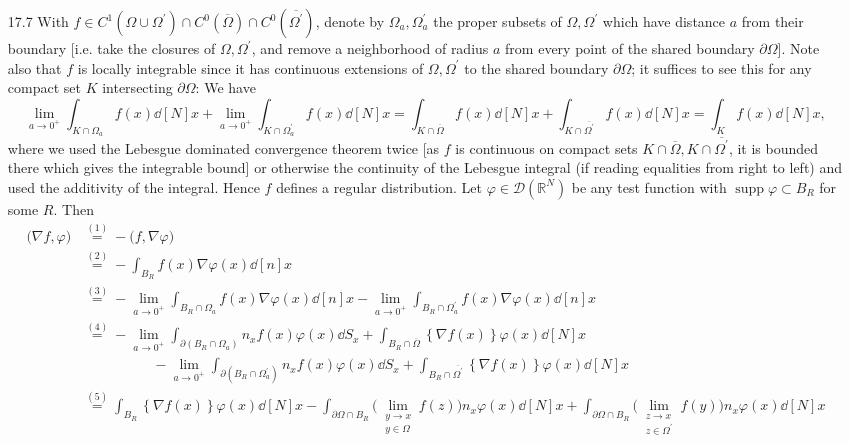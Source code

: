 \documentclass[11pt]{article}
\newcommand{\cbr}[1]{\left\{#1\right\}}
\newcommand{\eq}[1]{\overset{(#1)}{=}}
\DeclareMathOperator{\supp}{supp}
\begin{document}
\begin{enumerate}
    \hrulefill

    \item[17.7] With $f\in C^1(\Omega\cup \Omega^\prime)\cap C^0(\overline \Omega)\cap C^0(\overline{\Omega^\prime})$, denote by $\Omega_a,\Omega^\prime_a$ the proper subsets of $\Omega,\Omega^\prime$ which have distance $a$ from their boundary [i.e. take the closures of $\Omega,\Omega^\prime$, and remove a neighborhood of radius $a$ from every point of the shared boundary $\partial \Omega$]. Note also that $f$ is locally integrable since it has continuous extensions of $\Omega,\Omega^\prime$ to the shared boundary $\partial \Omega$; it suffices to see this for any compact set $K$ intersecting $\partial \Omega$: We have %
    \[\lim_{a\to 0^+}\int_{K\cap \Omega_a}f(x)\dd[N]x+\lim_{a\to 0^+}\int_{K\cap\Omega^\prime_a} f(x)\dd[N]x = \int_{K\cap\overline{\Omega}}f(x)\dd[N]x + \int_{K\cap\overline{\Omega^\prime}}f(x)\dd[N]x = \int_{K}f(x)\dd[N]x,\] where we used the Lebesgue dominated convergence theorem twice [as $f$ is continuous on compact sets $K\cap\overline{\Omega},K\cap\overline{\Omega^\prime}$, it is bounded there which gives the integrable bound] or otherwise the continuity of the Lebesgue integral (if reading equalities from right to left) and used the additivity of the integral. Hence $f$ defines a regular distribution. Let $\varphi\in\mathcal{D}(\mathbb{R}^N)$ be any test function with $\supp\varphi\subset B_R$ for some $R$. Then 
    \begin{align*}
        \Big(\nabla f,\varphi\Big)&\eq{1} -\Big(f,\nabla \varphi\Big)\\
        &\eq{2} -\int_{B_R}f(x)\nabla\varphi(x)\dd[n]x\\
        &\eq{3} -\lim_{a\to 0^+}\int_{B_R\cap\Omega_a}f(x)\nabla\varphi(x)\dd[n]x -\lim_{a\to 0^+}\int_{B_R\cap\Omega^\prime_a}f(x)\nabla\varphi(x)\dd[n]x\\
        &\eq{4} -\lim_{a\to 0^+}\int_{\partial (B_R\cap \Omega_a)}n_xf(x)\varphi(x)\dd S_x + \int_{B_R\cap\overline\Omega}\cbr{\nabla f(x)}\varphi(x)\dd[N]x\\
        &\hspace{5em} -\lim_{a\to 0^+}\int_{\partial (B_R\cap \Omega^\prime_a)}n_xf(x)\varphi(x)\dd S_x + \int_{B_R\cap\overline{\Omega^\prime}}\cbr{\nabla f(x)}\varphi(x)\dd[N]x\\
        &\eq{5} \int_{B_R}\cbr{\nabla f(x)}\varphi(x)\dd[N]x - \int_{\partial\Omega\cap B_R} \Big(\lim_{\substack{y\to x\\ y\in\Omega}}f(z)\Big)n_x\varphi(x)\dd[N]x + \int_{\partial\Omega\cap B_R} \Big(\lim_{\substack{z\to x\\ z\in\Omega^\prime}}f(y)\Big)n_x\varphi(x)\dd[N]x\\

\end{align*}
\end{enumerate}
\end{document}
